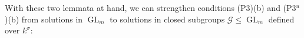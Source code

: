\documentclass[oneside,reqno]{amsart}
\newtheorem{lemma}[theo]{Lemma}
\theoremstyle{definition}
\newcommand{\G}{\mathcal{G}}
\newcommand{\Gl}{\operatorname{GL}}
\newcommand{\s}{\sigma}
\newcommand{\ks}{$k$\=/$\s$}
\newcommand{\pt}{{\rm{(P3$^u$)}}}
\newcommand{\ptweak}{{\rm{(P3)}}}
\begin{document}

With these two lemmata at hand, we can strengthen conditions \ptweak{}(b) and \pt{}(b) from solutions in $\Gl_m$ to solutions in closed subgroups $\G\leq \Gl_m$ defined over $k^\s$:
\end{document}
